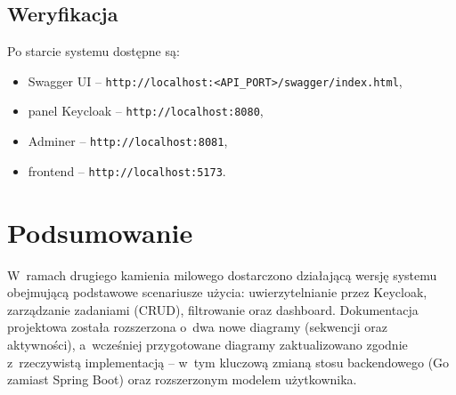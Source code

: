 \documentclass[12pt, a4paper, oneside]{article}
\begin{document}
\subsection{Weryfikacja}
Po starcie systemu dostępne są:
\begin{itemize}
  \item Swagger UI -- \texttt{http://localhost:<API\_PORT>/swagger/index.html},
  \item panel Keycloak -- \texttt{http://localhost:8080},
  \item Adminer -- \texttt{http://localhost:8081},
  \item frontend -- \texttt{http://localhost:5173}.
\end{itemize}

\section{Podsumowanie}

W~ramach drugiego kamienia milowego dostarczono działającą wersję systemu obejmującą podstawowe scenariusze użycia: uwierzytelnianie przez Keycloak, zarządzanie zadaniami (CRUD), filtrowanie oraz dashboard. Dokumentacja projektowa została rozszerzona o~dwa nowe diagramy (sekwencji oraz aktywności), a~wcześniej przygotowane diagramy zaktualizowano zgodnie z~rzeczywistą implementacją -- w~tym kluczową zmianą stosu backendowego (Go zamiast Spring Boot) oraz rozszerzonym modelem użytkownika.
\end{document}
